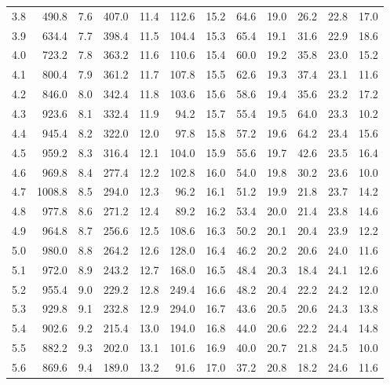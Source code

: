 \documentclass[UTF8]{ctexart}
\begin{document}
{\begin{longtable}{||r|r||r|r||r|r||r|r||r|r||r|r||}
		3.8   & 490.8  & 7.6   & 407.0  & 11.4  & 112.6  & 15.2  & 64.6  & 19.0  & 26.2  & 22.8  & 17.0  \\
		3.9   & 634.4  & 7.7   & 398.4  & 11.5  & 104.4  & 15.3  & 65.4  & 19.1  & 31.6  & 22.9  & 18.6  \\
		4.0   & 723.2  & 7.8   & 363.2  & 11.6  & 110.6  & 15.4  & 60.0  & 19.2  & 35.8  & 23.0  & 15.2  \\
		4.1   & 800.4  & 7.9   & 361.2  & 11.7  & 107.8  & 15.5  & 62.6  & 19.3  & 37.4  & 23.1  & 11.6  \\
		4.2   & 846.0  & 8.0   & 342.4  & 11.8  & 103.6  & 15.6  & 58.6  & 19.4  & 35.6  & 23.2  & 17.2  \\
		4.3   & 923.6  & 8.1   & 332.4  & 11.9  & 94.2  & 15.7  & 55.4  & 19.5  & 64.0  & 23.3  & 10.2  \\
		4.4   & 945.4  & 8.2   & 322.0  & 12.0  & 97.8  & 15.8  & 57.2  & 19.6  & 64.2  & 23.4  & 15.6  \\
		4.5   & 959.2  & 8.3   & 316.4  & 12.1  & 104.0  & 15.9  & 55.6  & 19.7  & 42.6  & 23.5  & 16.4  \\
		4.6   & 969.8  & 8.4   & 277.4  & 12.2  & 102.8  & 16.0  & 54.0  & 19.8  & 30.2  & 23.6  & 10.0  \\
		4.7   & 1008.8  & 8.5   & 294.0  & 12.3  & 96.2  & 16.1  & 51.2  & 19.9  & 21.8  & 23.7  & 14.2  \\
		4.8   & 977.8  & 8.6   & 271.2  & 12.4  & 89.2  & 16.2  & 53.4  & 20.0  & 21.4  & 23.8  & 14.6  \\
		4.9   & 964.8  & 8.7   & 256.6  & 12.5  & 108.6  & 16.3  & 50.2  & 20.1  & 20.4  & 23.9  & 12.2  \\
		5.0   & 980.0  & 8.8   & 264.2  & 12.6  & 128.0  & 16.4  & 46.2  & 20.2  & 20.6  & 24.0  & 11.6  \\
		5.1   & 972.0  & 8.9   & 243.2  & 12.7  & 168.0  & 16.5  & 48.4  & 20.3  & 18.4  & 24.1  & 12.6  \\
		5.2   & 955.4  & 9.0   & 229.2  & 12.8  & 249.4  & 16.6  & 48.2  & 20.4  & 22.2  & 24.2  & 12.0  \\
		5.3   & 929.8  & 9.1   & 232.8  & 12.9  & 294.0  & 16.7  & 43.6  & 20.5  & 20.6  & 24.3  & 13.8  \\
		5.4   & 902.6  & 9.2   & 215.4  & 13.0  & 194.0  & 16.8  & 44.0  & 20.6  & 22.2  & 24.4  & 14.8  \\
		5.5   & 882.2  & 9.3   & 202.0  & 13.1  & 101.6  & 16.9  & 40.0  & 20.7  & 21.8  & 24.5  & 10.0  \\
		5.6   & 869.6  & 9.4   & 189.0  & 13.2  & 91.6  & 17.0  & 37.2  & 20.8  & 18.2  & 24.6  & 11.6  \\

\end{longtable}}
\end{document}
